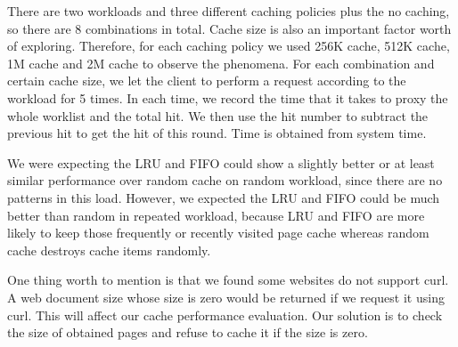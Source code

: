 \documentclass[paper=a4, fontsize=11pt]{scrartcl} %
\numberwithin{equation}{section} %
\numberwithin{figure}{section} %
\numberwithin{table}{section} %
\begin{document}
There are two workloads and three different caching policies plus the no caching, so there are 8 combinations in total. Cache size is also an important factor worth of exploring. Therefore, for each caching policy we used 256K cache, 512K cache, 1M cache and 2M cache to observe the phenomena. For each combination and certain cache size, we let the client to perform a request according to the workload for 5 times. In each time, we record the time that it takes to proxy the whole worklist and the total hit. We then use the hit number to subtract the previous hit to get the hit of this round. Time is obtained from system time. 

We were expecting the LRU and FIFO could show a slightly better or at least similar performance over random cache on random workload, since there are no patterns in this load. However, we expected the LRU and FIFO could be much better than random in repeated workload, because LRU and FIFO are more likely to keep those frequently or recently visited page cache whereas random cache destroys cache items randomly. 

One thing worth to mention is that we found some websites do not support curl. A web document size whose size is zero would be returned if we request it using curl. This will affect our cache performance evaluation. Our solution is to check the size of obtained pages and refuse to cache it if the size is zero. 
\end{document}
